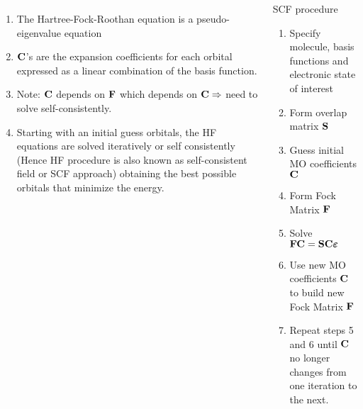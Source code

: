 \documentclass[slidestop,mathserif,compress,xcolor=svgnames]{beamer}
\begin{document}
\begin{frame}
\footnotesize{
\begin{columns}
\column{12cm}
\begin{enumerate}
\item The Hartree-Fock-Roothan equation is a pseudo-eigenvalue equation
\item ${\bf C}$'s are the expansion coefficients for each orbital expressed as a linear combination of the basis function.
\item Note: ${\bf C}$ depends on ${\bf F}$ which depends on ${\bf C}\Rightarrow$ need to solve self-consistently.
\item Starting with an initial guess orbitals, the HF equations are solved iteratively or self consistently (Hence HF procedure is also known as self-consistent field or SCF approach) obtaining the best possible orbitals that minimize the energy.
\end{enumerate}
\vspace{-0.3cm}
\begin{block}{\footnotesize SCF procedure}
\begin{enumerate}
\item Specify molecule, basis functions and electronic state of interest
\item Form overlap matrix ${\bf S}$
\item Guess initial MO coefficients ${\bf C}$
\item Form Fock Matrix ${\bf F}$
\item Solve ${\bf FC}={\bf SC}{\boldsymbol\varepsilon}$
\item Use new MO coefficients ${\bf C}$ to build new Fock Matrix ${\bf F}$
\item Repeat steps 5 and 6 until ${\bf C}$ no longer changes from one iteration to the next.
\end{enumerate}
\end{block}
\end{columns}
}
\end{frame}
\end{document}
